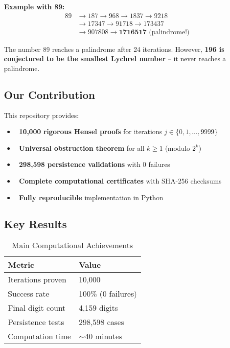 \documentclass[11pt,a4paper]{article}
\newcommand{\cmark}{\ding{51}}
\begin{document}
\textbf{Example with 89:}
\begin{align*}
89 &\to 187 \to 968 \to 1837 \to 9218 \\
&\to 17347 \to 91718 \to 173437 \\
&\to 907808 \to \textbf{1716517} \text{ (palindrome!)}
\end{align*}

The number 89 reaches a palindrome after 24 iterations. However, \textbf{196 is conjectured to be the smallest Lychrel number} -- it never reaches a palindrome.

\subsection{Our Contribution}

This repository provides:

\begin{itemize}[leftmargin=*]
\item \cmark\ \textbf{10,000 rigorous Hensel proofs} for iterations $j \in \{0, 1, \ldots, 9999\}$
\item \cmark\ \textbf{Universal obstruction theorem} for all $k \geq 1$ (modulo $2^k$)
\item \cmark\ \textbf{298,598 persistence validations} with 0 failures
\item \cmark\ \textbf{Complete computational certificates} with SHA-256 checksums
\item \cmark\ \textbf{Fully reproducible} implementation in Python
\end{itemize}

\subsection{Key Results}

\begin{table}[H]
\centering
\caption{Main Computational Achievements}
\begin{tabular}{@{}ll@{}}
\toprule
\textbf{Metric} & \textbf{Value} \\
\midrule
Iterations proven & 10,000 \\
Success rate & 100\% (0 failures) \\
Final digit count & 4,159 digits \\
Persistence tests & 298,598 cases \\
Computation time & $\sim$40 minutes \\
\bottomrule
\end{tabular}
\end{table}
\end{document}
